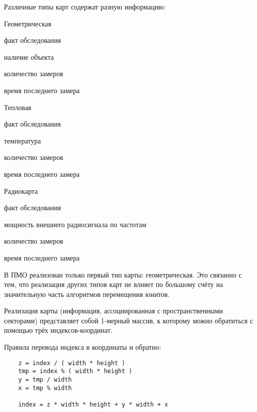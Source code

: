 Различные типы карт содержат разную информацию:

\begin{mintemize}

\item Геометрическая

    \begin{mintemize}
    \item факт обследования
    \item наличие объекта
    \item количество замеров
    \item время последнего замера
    \end{mintemize}

\item Тепловая

    \begin{mintemize}
    \item факт обследования
    \item температура
    \item количество замеров
    \item время последнего замера
    \end{mintemize}

\item Радиокарта

    \begin{mintemize}
    \item факт обследования
    \item мощность внешнего радиосигнала по частотам
    \item количество замеров
    \item время последнего замера
    \end{mintemize}

\end{mintemize}

В ПМО реализован только первый тип карты: геометрическая. Это связанно с тем, что
реализация других типов карт не влияет по большому счёту на значительную часть
алгоритмов перемещения юнитов.

Реализация карты (информация, ассоциированная с пространственными секторами)
представляет собой 1-мерный массив, к которому можно обратиться с помощью трёх
индексов-координат.

Правила перевода индекса в координаты и обратно:

\begin{verbatim}
    z = index / ( width * height )
    tmp = index % ( width * height )
    y = tmp / width
    x = tmp % width

    index = z * width * height + y * width + x
\end{verbatim}
\vspace{-0.5em}

